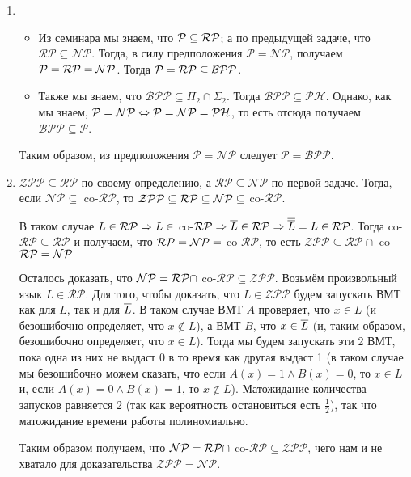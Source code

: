 \documentclass[a4paper,12pt]{article}
\begin{document}
\begin{solution}
\begin{enumerate}
	\item \begin{itemize}
		\item 
	Из семинара мы знаем, что $\P \subseteq \mathcal{RP}$; а по предыдущей задаче, что $\mathcal{RP}\subseteq \mathcal{NP}$. Тогда, в силу предположения $\mathcal{P} = \mathcal{NP}$, получаем $\P = \mathcal{RP} = \NP$. Тогда $\P = \mathcal{RP} \subseteq \mathcal{BPP}$.
	
	\item
	Также мы знаем, что $\mathcal{BPP} \subseteq \Pi_2 \cap \Sigma_2$. Тогда $\mathcal{BPP} \subseteq \mathcal{PH}$. Однако, как мы знаем, $\mathcal{P} = \mathcal{NP} \LRa \mathcal{P} = \mathcal{NP} = \mathcal{PH}$, то есть отсюда получаем $\mathcal{BPP} \subseteq \mathcal{P}$.
\end{itemize}
	
	Таким образом, из предположения $\mathcal{P} = \mathcal{NP}$ следует $\mathcal{P} = \mathcal{BPP}$.
	
	\item $\mathcal{ZPP} \subseteq \mathcal{RP}$ по своему определению, а $\mathcal{RP} \subseteq \mathcal{NP}$ по первой задаче. Тогда, если $\mathcal{NP} \subseteq $ co-$\mathcal{RP}$, то $\mathcal{ZPP} \subseteq \mathcal{RP} \subseteq \NP \subseteq $ co-$\mathcal{RP}$.
	
	В таком случае $L \in \mathcal{RP} \Ra L \in $ co-$\mathcal{RP} \Ra \ol{L} \in \mathcal{RP} \Ra \ol{\ol{L}} = L \in \mathcal{RP}$. Тогда co-$\mathcal{RP} \subseteq \mathcal{RP}$ и получаем, что $\mathcal{RP} = \NP = $ co-$\mathcal{RP}$, то есть  $\mathcal{ZPP} \subseteq \mathcal{RP} \cap $ co-$\mathcal{RP} = \NP$
	
	Осталось доказать, что  $\NP = \mathcal{RP} \cap $ co-$\mathcal{RP} \subseteq \mathcal{ZPP}$. Возьмём произвольный язык $L \in \mathcal{RP}$. Для того, чтобы доказать, что $L \in \mathcal{ZPP}$ будем запускать ВМТ как для $L$, так и для $\ol{L}$. В таком случае ВМТ $A$ проверяет, что $x \in L$ (и безошибочно определяет, что $x \notin L$), а ВМТ $B$, что $x \in \ol{L}$ (и, таким образом, безошибочно определяет, что $x \in L$). Тогда мы будем запускать эти 2 ВМТ, пока одна из них не выдаст 0 в то время как другая выдаст 1 (в таком случае мы безошибочно можем сказать, что если $A(x) = 1 \wedge B(x) = 0$, то $x \in L$ и, если $A(x) = 0 \wedge B(x) = 1$, то $x \notin L$). Матожидание количества запусков равняется 2 (так как вероятность остановиться есть $\frac{1}{2}$), так что матожидание времени работы полиномиально.
	
	Таким образом получаем, что $\NP = \mathcal{RP} \cap $ co-$\mathcal{RP} \subseteq \mathcal{ZPP}$, чего нам и не хватало для доказательства $\mathcal{ZPP} = \mathcal{NP}$.
\end{enumerate}
\end{solution}
\end{document}
